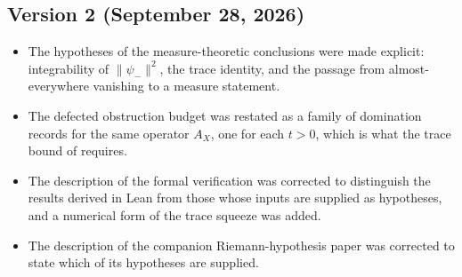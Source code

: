 \documentclass[11pt]{article}
\newcommand{\psim}{\psi_{-}}
\newcommand{\AX}{A_{X}}
\theoremstyle{definition}
\begin{document}
\subsection*{Version 2 (September 28, 2026)}

\begin{itemize}
  \item The hypotheses of the measure-theoretic conclusions were made
    explicit: integrability of \(\|\psim\|^2\), the trace identity, and
    the passage from almost-everywhere vanishing to a measure
    statement.
  \item The defected obstruction budget was restated as a family of
    domination records for the same operator \(\AX\), one for each
    \(t>0\), which is what the trace bound of
     requires.
  \item The description of the formal verification was corrected to
    distinguish the results derived in Lean from those whose inputs are
    supplied as hypotheses, and a numerical form of the trace squeeze
    was added.
  \item The description of the companion Riemann-hypothesis paper was
    corrected to state which of its hypotheses are supplied.
\end{itemize}
\end{document}
